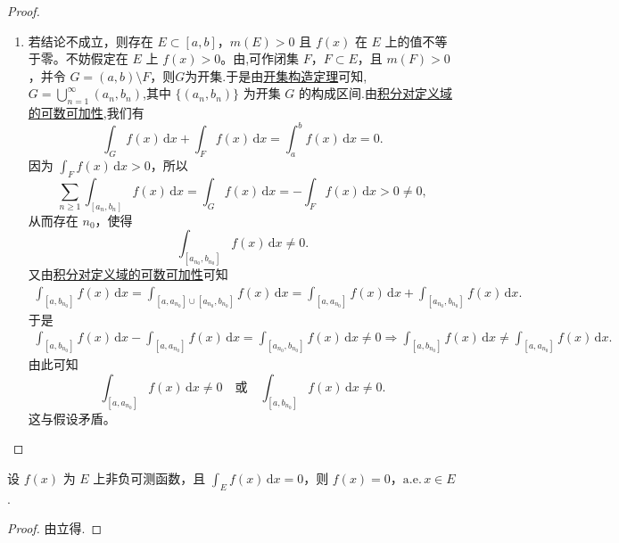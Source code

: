 \documentclass[../../main.tex]{subfiles}%
\begin{document}
\begin{proof}
\begin{enumerate}[(1)]
\item 若结论不成立，则存在 $E \subset [a,b]$，$m(E) > 0$ 且 $f(x)$ 在 $E$ 上的值不等于零。不妨假定在 $E$ 上 $f(x) > 0$。由,可作闭集 $F$，$F \subset E$，且 $m(F) > 0$，并令 $G = (a,b) \setminus F$，则$G$为开集.于是由\hyperref[theorem:开集构造定理]{开集构造定理}可知,$G=\bigcup_{n=1}^{\infty}{\left( a_n,b_n \right)}$,其中 $\{ (a_n, b_n) \}$ 为开集 $G$ 的构成区间.由\hyperref[theorem:积分对定义域的可数可加性]{积分对定义域的可数可加性},我们有
\[
\int_G f(x) \, \mathrm{d}x + \int_F f(x) \, \mathrm{d}x = \int_a^b f(x) \, \mathrm{d}x = 0.
\]
因为 $\int_F f(x) \, \mathrm{d}x > 0$，所以
\[
\sum_{n \geqslant 1} \int_{[a_n, b_n]} f(x) \, \mathrm{d}x = \int_G f(x) \, \mathrm{d}x = -\int_F f(x) \, \mathrm{d}x > 0\neq 0,
\]
从而存在 $n_0$，使得
\[
\int_{[a_{n_0}, b_{n_0}]} f(x) \, \mathrm{d}x \neq 0.
\]
又由\hyperref[theorem:积分对定义域的可数可加性]{积分对定义域的可数可加性}可知
\begin{align*}
\int_{[a,b_{n_0}]}{f(x)\,\mathrm{d}x}=\int_{[a,a_{n_0}]\cup [a_{n_0},b_{n_0}]}{f(x)\,\mathrm{d}x}=\int_{[a,a_{n_0}]}{f(x)\,\mathrm{d}x}+\int_{[a_{n_0},b_{n_0}]}{f(x)\,\mathrm{d}x.}
\end{align*}
于是
\begin{align*}
\int_{[a,b_{n_0}]}{f(x)\,\mathrm{d}x}-\int_{[a,a_{n_0}]}{f(x)\,\mathrm{d}x}=\int_{[a_{n_0},b_{n_0}]}{f(x)\,\mathrm{d}x}\ne 0\Rightarrow \int_{[a,b_{n_0}]}{f(x)\,\mathrm{d}x}\ne \int_{[a,a_{n_0}]}{f(x)\,\mathrm{d}x}.
\end{align*}
由此可知
\[
\int_{[a, a_{n_0}]} f(x) \, \mathrm{d}x \neq 0 \quad \text{或} \quad \int_{[a, b_{n_0}]} f(x) \, \mathrm{d}x \neq 0.
\]
这与假设矛盾。
\end{enumerate}

\end{proof}

\begin{corollary}\label{corollary:非负可测函数积分为0则几乎处处为0}
设 \( f(x) \) 为 \( E \) 上非负可测函数，且 \( \int_E f(x)\,\mathrm{d}x = 0 \)，则 \( f(x) = 0 \)，\(\text{a.e.}\, x \in E \). 
\end{corollary}
\begin{proof}

由立得.

\end{proof}
\end{document}
